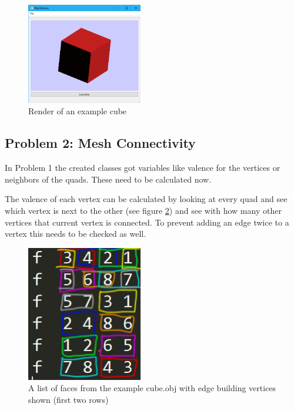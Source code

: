 \documentclass[11.5pt,oneside,a4paper]{scrartcl}
\newcounter{ct}
\begin{document}
\begin{figure}
	\centering
	\includegraphics[width=0.45\textwidth]{renderedcube.png}
	\caption{Render of an example cube}
	\label{fig:renderedcube}
\end{figure}

\subsection{Problem 2: Mesh Connectivity}

In Problem 1 the created classes got variables like valence for the vertices or neighbors of the quads. These need to be calculated now.

The valence of each vertex can be calculated by looking at every quad and see which vertex is next to the other (see figure \ref{fig:faces}) and see with how many other vertices that current vertex is connected. To prevent adding an edge twice to a vertex this needs to be checked as well.

\begin{figure}
	\includegraphics[width=0.45\textwidth]{faces.png}
	\caption{A list of faces from the example cube.obj with edge building vertices shown (first two rows)}
	\label{fig:faces}
\end{figure}
\end{document}
